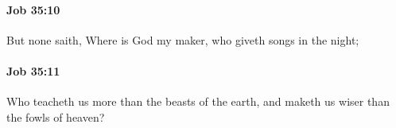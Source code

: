 		\paragraph{Job 35:10} %
			\label{JOB-35-10}

			But none saith, Where is God my maker, who giveth songs in the night;


		\paragraph{Job 35:11} %
			\label{JOB-35-11}

			Who teacheth us more than the beasts of the earth, and maketh us wiser than the fowls of heaven?


